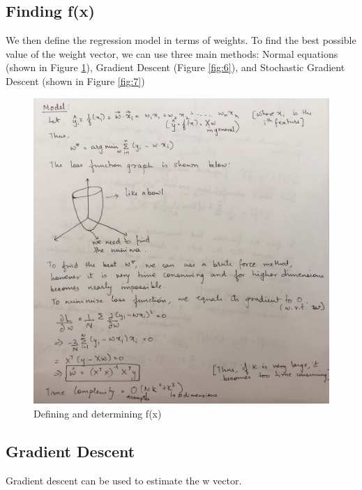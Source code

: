\subsection{Finding f(x)}
We then define the regression model in terms of weights. To find the best possible value of the weight vector, we can use three main methods: Normal equations (shown in Figure \ref{fig:5}), Gradient Descent (Figure \ref{fig:6}), and Stochastic Gradient Descent (shown in Figure \ref{fig:7})
\begin{figure}[!ht]
  \begin{center}
    \includegraphics[scale=0.7]{figures/5.png}
    \caption{Defining and determining f(x) }
    \label{fig:5}
  \end{center}
\end{figure}

\newpage
\subsection{Gradient Descent}
Gradient descent can be used to estimate the w vector.


